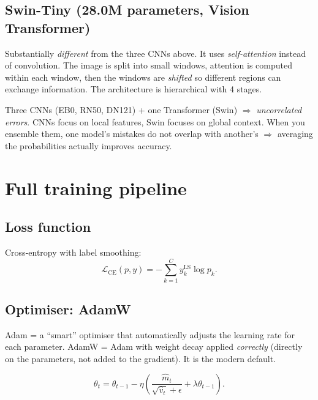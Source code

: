 \documentclass[11pt,a4paper]{article}
\begin{document}
\subsection{Swin-Tiny (28.0M parameters, Vision Transformer)}

\begin{simple}
Substantially \textit{different} from the three CNNs above. It uses \textit{self-attention} instead of convolution. The image is split into small windows, attention is computed within each window, then the windows are \textit{shifted} so different regions can exchange information. The architecture is hierarchical with 4 stages.
\end{simple}

\begin{idea}
Three CNNs (EB0, RN50, DN121) + one Transformer (Swin) $\Rightarrow$ \textit{uncorrelated errors}. CNNs focus on local features, Swin focuses on global context. When you ensemble them, one model's mistakes do not overlap with another's $\Rightarrow$ averaging the probabilities actually improves accuracy.
\end{idea}

\section{Full training pipeline}

\subsection{Loss function}

Cross-entropy with label smoothing:
\[
  \mathcal{L}_{\text{CE}}(p, y) = -\sum_{k=1}^C y^{\text{LS}}_k \log p_k.
\]

\subsection{Optimiser: AdamW}

\begin{simple}
Adam = a ``smart'' optimiser that automatically adjusts the learning rate for each parameter. AdamW = Adam with weight decay applied \textit{correctly} (directly on the parameters, not added to the gradient). It is the modern default.
\end{simple}

\[
  \theta_t = \theta_{t-1} - \eta \left( \frac{\hat{m}_t}{\sqrt{\hat{v}_t} + \epsilon} + \lambda \theta_{t-1} \right).
\]
\end{document}
